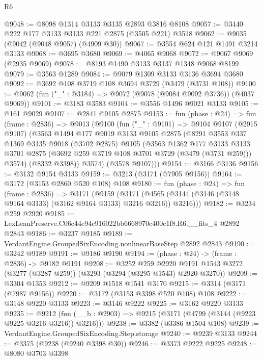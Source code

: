 \begin{lexlean}{R6}
\begin{coremodule}
@9048 := @8098 @1314 @3133 @3135 @2893 @3816 @8108
@9057 := @3440 @222 @177 @3133 @3133 @221 @2875 (@3505 @221) @3518
@9062 := @9035 (@9042 (@9048 @9057) (@4909 @30))
@9067 := @3554 @624 @121 @1491 @3214 @3133
@9068 := @3695 @3680
@9069 := @4065 @9068
@9072 := @9067 @9069 (@2935 @9069)
@9078 := @8193 @1490 @3133 @3137 @1348 @9068 @8199
@9079 := @3563 @1289
@9084 := @9079 @1309 @3133 @3136 @3694 @3680
@9092 := @3692 @108 @3719 @108 @3694 @3729 (@3479 (@3731 @108))
@9100 := @9062 (fun ("_" : @3184) => @9072 (@9078 (@9084 @9092 @3736)) (@4037 @9069))
@9101 := @3183 @3583
@9104 := @3556 @1496 @9021 @3133
@9105 := @161 @9029
@9107 := @2841 @9105 @2875
@9153 := fun (phase : @24) =>
  fun (frame : @2836) =>
  @9013
    (@9100
      (fun ("_" : @9101) =>
      @9104
        @9107
        (@2915 @9107)
        (@3563
          @1494
          @177
          @9019
          @3133
          @9105
          @2875
          (@8291
            @3553
            @337
            @1369
            @3135
            @9018
            (@3702 @2875)
            @9105
            (@3563
              @1362
              @177
              @3133
              @3133
              @3701
              @2875
              (@3692 @259 @3719 @108 @3701 @3729 (@3479 (@3731 @259)))
              @3574)
            (@8332 @3398))
          @3574)
        (@3578 @9107)))
@9154 := @3166 @3136
@9156 := @3132 @9154 @3133
@9159 := @3213 (@3171 (@7905 @9156))
@9164 := @3172 (@3153 @2860 @520 @108) @108
@9180 := fun (phase : @24) =>
  fun (frame : @2836) =>
  @3171
    (@9159
      (@3171 (@4565 (@3144 (@3146 (@3148 @9164 @3133) (@3162 @9164 @3133) @3216 @3216)) @3216)))
@9182 := @3234 @259 @2920
@9185 := LexLeanPreserve.C06c44e94c916022bb6668970c400c1f8.R6.__fits_4 @2892 @2843
@9186 := @3237 @9185
@9189 := VerdantEngine.GroupedSixEncoding.nonlinearBaseStep @2892 @2843
@9190 := @3242 @9189
@9191 := @9186 @9190
@9194 := (phase : @24) -> (frame : @2836) -> @9182 @9191
@9208 := @3252
    @259
    @2920
    @9191
    @1543
    @3272
    (@3277 (@3287 @259))
    (@3293 (@3294 (@3295 @1543) @2920 @3270))
@9209 := @3304 @1353
@9212 := @9209 @1518 @1541 @3170
@9215 := @3314 (@3171 (@7987 @9156))
@9220 := @3172 (@3153 @3398 @520 @108) @108
@9222 := @3148 @9220 @3133
@9223 := @3146 @9222
@9225 := @3162 @9220 @3133
@9235 := @9212 (fun (__b : @2903) => @9215 (@3171 (@4799 (@3144 (@9223 @9225 @3216 @3216)) @3216)))
@9238 := @3382 (@3386 @1504 @108)
@9239 := VerdantEngine.GroupedSixEncoding.Step.storage
@9240 := @9239 @3133
@9244 := @3375 (@9238 (@9240 @3398 @30))
@9246 := @3373 @9222 @9225
@9248 := @8080 @3703 @3398

\end{coremodule}
\end{lexlean}
